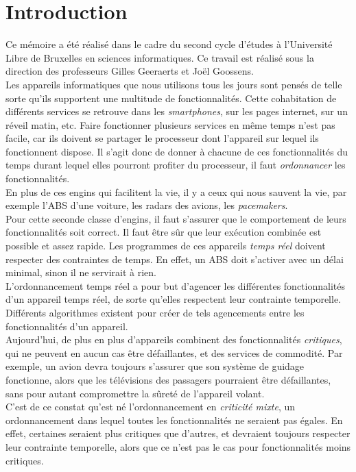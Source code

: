 \documentclass[12pt,a4paper,oneside]{book}
\theoremstyle{break}
\theoremstyle{breakplain}
\begin{document}
\chapter{Introduction}
Ce mémoire a été réalisé dans le cadre du second cycle d'études à l'Université Libre de Bruxelles en sciences informatiques. Ce travail est réalisé sous la direction des professeurs Gilles Geeraerts et Joël Goossens.\\

Les appareils informatiques que nous utilisons tous les jours sont pensés de telle sorte qu'ils supportent une multitude de fonctionnalités. Cette cohabitation de différents services se retrouve dans les \textit{smartphones}, sur les pages internet, sur un réveil matin, etc. Faire fonctionner plusieurs services en même temps n'est pas facile, car ils doivent se partager le processeur dont l'appareil sur lequel ils fonctionnent dispose. Il s'agit donc de donner à chacune de ces fonctionnalités du temps durant lequel elles pourront profiter du processeur, il faut \textit{ordonnancer} les fonctionnalités.\\

En plus de ces engins qui facilitent la vie, il y a ceux qui nous sauvent la vie, par exemple l'ABS d'une voiture, les radars des avions, les \textit{pacemakers}.\\
Pour cette seconde classe d'engins, il faut s'assurer que le comportement de leurs fonctionnalités soit correct. Il faut être sûr que leur exécution combinée est possible et assez rapide. Les programmes de ces appareils \textit{temps réel} doivent respecter des contraintes de temps. En effet, un ABS doit s'activer avec un délai minimal, sinon il ne servirait à rien.\\
L'ordonnancement temps réel a pour but d'agencer les différentes fonctionnalités d'un appareil temps réel, de sorte qu'elles respectent leur contrainte temporelle.\\
Différents algorithmes existent pour créer de tels agencements entre les fonctionnalités d'un appareil.\\

Aujourd'hui, de plus en plus d'appareils combinent des fonctionnalités \textit{critiques}, qui ne peuvent en aucun cas être défaillantes, et des services de commodité. Par exemple, un avion devra toujours s'assurer que son système de guidage fonctionne, alors que les télévisions des passagers pourraient être défaillantes, sans pour autant compromettre la sûreté de l'appareil volant.\\
C'est de ce constat qu'est né l'ordonnancement en \textit{criticité mixte}, un ordonnancement dans lequel toutes les fonctionnalités ne seraient pas égales. En effet, certaines seraient plus critiques que d'autres, et devraient toujours respecter leur contrainte temporelle, alors que ce n'est pas le cas pour fonctionnalités moins critiques.\\
\end{document}
